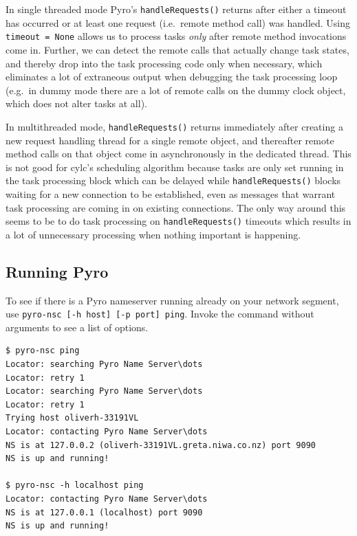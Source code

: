 \documentclass[11pt,a4paper]{article}
\begin{document}
In single threaded mode Pyro's \lstinline=handleRequests()= returns
after either a timeout has occurred or at least one request
(i.e.\ remote method call) was handled. Using \lstinline|timeout = None| 
allows us to process tasks {\em only} after remote method invocations
come in.  Further, we can detect the remote calls that actually change
task states, and thereby drop into the task processing code only when
necessary, which eliminates a lot of extraneous output when debugging
the task processing loop (e.g.\ in dummy mode there are a lot of remote
calls on the dummy clock object, which does not alter tasks at all). 

In multithreaded mode, \lstinline=handleRequests()= returns immediately
after creating a new request handling thread for a single remote object,
and thereafter remote method calls on that object come in asynchronously
in the dedicated thread. This is not good for cylc's scheduling
algorithm because tasks are only set running in the task processing
block which can be delayed while \lstinline=handleRequests()= blocks waiting
for a new connection to be established, even as messages that warrant
task processing are coming in on existing connections. The only way
around this seems to be to do task processing on \lstinline=handleRequests()=
timeouts which results in a lot of unnecessary processing when nothing
important is happening.

\subsection{Running Pyro}
\label{RunningPyro}

To see if there is a Pyro nameserver running already on your network
segment, use \lstinline=pyro-nsc [-h host] [-p port] ping=. Invoke the
command without arguments to see a list of options.

\lstset{language=bash}

\begin{lstlisting}
$ pyro-nsc ping
Locator: searching Pyro Name Server\dots
Locator: retry 1
Locator: searching Pyro Name Server\dots
Locator: retry 1
Trying host oliverh-33191VL
Locator: contacting Pyro Name Server\dots
NS is at 127.0.0.2 (oliverh-33191VL.greta.niwa.co.nz) port 9090
NS is up and running!

$ pyro-nsc -h localhost ping
Locator: contacting Pyro Name Server\dots
NS is at 127.0.0.1 (localhost) port 9090
NS is up and running!
\end{lstlisting}
\end{document}
